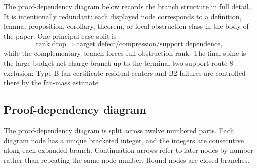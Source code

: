 \documentclass[11pt]{article}
\begin{document}
The proof-dependency diagram below records the branch structure in full detail.  It is intentionally redundant: each displayed node corresponds to a definition, lemma, proposition, corollary, theorem, or local obstruction class in the body of the paper.  One principal case split is
\[
\text{rank drop}\Rightarrow\text{target defect/compression/support dependence},
\]
while the complementary branch forces full obstruction rank.  The final spine is
the large-budget net-charge branch up to the terminal two-support route-8
exclusion; Type B fan-certificate residual centers and B2 failures are controlled
there by the fan-mass estimate.



\subsection*{Proof-dependency diagram}

The proof-dependency diagram is split across twelve numbered parts.  Each
diagram node has a unique bracketed integer, and the integers are consecutive
along each expanded branch.  Continuation arrows refer to later nodes by number rather
than repeating the same node number.  Round nodes are closed branches.
\end{document}
